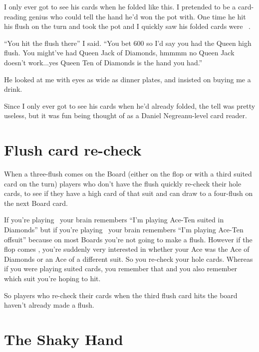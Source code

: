 I only ever got to see his cards when he folded like this. I pretended
to be a card-reading genius who could tell the hand he'd won the pot
with. One time he hit his flush on the turn and took the pot and I
quickly saw his folded cards were \Qd\tend\ .

``You hit the flush there'' I said. ``You bet 600 so I'd
say you had the Queen high flush. You might've had Queen Jack of Diamonds,
hmmmm no Queen Jack doesn't work...yes Queen Ten of Diamonds is the hand
you had.''

He looked at me with eyes as wide as dinner plates, and insisted on buying
me a drink.

Since I only ever got to see his cards when he'd already folded, the tell
was pretty useless, but it was fun being thought of as a Daniel
Negreanu-level card reader.


\section{Flush card re-check}

When a three-flush comes on the Board (either on the flop or with
a third suited card on the turn) players who don't have the flush
quickly re-check their hole cards, to see if they have a high card
of that suit and can draw to a four-flush on the next Board card.

If you're playing \Ad\tend\ your brain remembers ``I'm playing Ace-Ten
suited in Diamonds'' but if you're playing \Ad\tens\ your brain remembers
``I'm playing Ace-Ten offsuit'' because on most Boards you're not going to
make a flush. However if the flop comes \Kd\eigd\sevd, you're suddenly
very interested in whether your Ace was the Ace of Diamonds or an Ace of
a different suit. So you re-check your hole cards. Whereas if you were
playing suited cards, you remember that and you also remember which suit
you're hoping to hit.

So players who re-check their cards when the third flush card hits the
board haven't already made a flush.

\section{The Shaky Hand}

